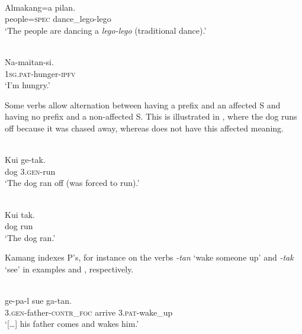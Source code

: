 \ea 
\label{ex:10:1235}
 \\
 \gll      Almakang=a   pilan.    \\
    people=\textsc{spec} dance\_lego-lego    \\
 \glt  `The people are dancing a \textit{lego-lego} (traditional dance).'
\z

 

 




\ea%
\label{bkm:Ref353455458}
 \\
\gll     Na-maitan-si. \\  
    \textsc{1sg.pat-}hunger-\textsc{ipfv}  \\
\glt  `I'm hungry.'
\z

 





Some verbs allow alternation between having a prefix and an affected S and having no prefix and a non-affected S. This is illustrated in , where the dog runs off because it was chased away, whereas  does not have this affected  meaning.


\ea%
\label{bkm:Ref353455505}
 \\
\gll   Kui  ge-tak.     \\  
     dog  3.\textsc{gen}{}-run     \\
\glt  `The dog ran off (was forced to run).'
\z




 



\ea%
\label{bkm:Ref324857914}
 \\
\gll    Kui  tak.  \\  
     dog  run   \\
\glt  `The dog ran.'
\z







Kamang  indexes P's, for instance on the verbs \textit{{}-tan} `wake someone up' and \textit{{}-tak} `see' in examples  and , respectively.


\ea 
\label{ex:10:1236}
 \\
 \gll    [\dots]  ge-pa-l  sue  ga-tan.  \\
    [{\dots}]  3.\textsc{gen}{}-father-\textsc{contr\_foc} arrive  3.\textsc{pat}{}-wake\_up   \\
 \glt  `[{\dots}] his father comes and wakes him.'
\z








